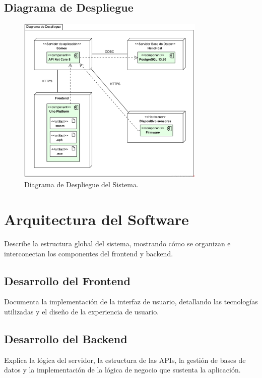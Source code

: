 
\subsection{Diagrama de Despliegue}
\begin{figure}[H]
    \centering
    \caption{Diagrama de Despliegue del Sistema.}
    \label{fig:despliegue}
    \includegraphics[width=0.8\textwidth]{UML/Otros/Diagrama de Despliegue.png}
\end{figure}


\section{Arquitectura del Software}

Describe la estructura global del sistema, mostrando cómo se organizan e interconectan los componentes del frontend y backend.

\subsection{Desarrollo del Frontend}
Documenta la implementación de la interfaz de usuario, detallando las tecnologías utilizadas y el diseño de la experiencia de usuario.

\subsection{Desarrollo del Backend}
Explica la lógica del servidor, la estructura de las APIs, la gestión de bases de datos y la implementación de la lógica de negocio que sustenta la aplicación.

